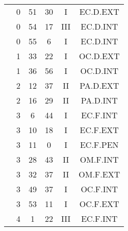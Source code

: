 \documentclass[12pt, a4paper]{article}
\begin{document}
\begin{multicols}{3}
{\begin{tabular}{c c c c c c}
	 	 	 	 & 0 & 51 & 30 & I & EC.D.EXT\\%
	 	 	 	 & 0 & 54 & 17 & III & EC.D.INT\\%
	 	 	 	 & 0 & 55 & 6 & I & EC.D.INT\\%
	 	 	 	 & 1 & 33 & 22 & I & OC.D.EXT\\%
	 	 	 	 & 1 & 36 & 56 & I & OC.D.INT\\%
	 	 	 	 & 2 & 12 & 37 & II & PA.D.EXT\\%
	 	 	 	 & 2 & 16 & 29 & II & PA.D.INT\\%
	 	 	 	 & 3 & 6 & 44 & I & EC.F.INT\\%
	 	 	 	 & 3 & 10 & 18 & I & EC.F.EXT\\%
	 	 	 	 & 3 & 11 & 0 & I & EC.F.PEN\\%
	 	 	 	 & 3 & 28 & 43 & II & OM.F.INT\\%
	 	 	 	 & 3 & 32 & 37 & II & OM.F.EXT\\%
	 	 	 	 & 3 & 49 & 37 & I & OC.F.INT\\%
	 	 	 	 & 3 & 53 & 11 & I & OC.F.EXT\\%
	 	 	 	 & 4 & 1 & 22 & III & EC.F.INT\\%
	 	 \end{tabular}
 	}
\end{multicols}
\end{document}
